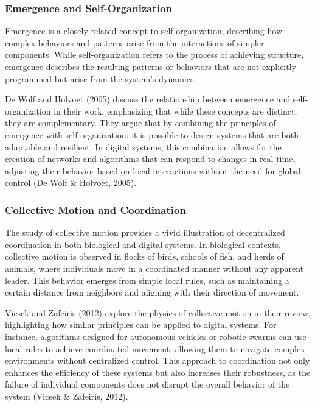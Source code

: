 \documentclass[12pt,twoside]{article}
\begin{document}
\subsubsection{Emergence and Self-Organization}

Emergence is a closely related concept to self-organization, describing how complex behaviors and patterns arise from the interactions of simpler components. While self-organization refers to the process of achieving structure, emergence describes the resulting patterns or behaviors that are not explicitly programmed but arise from the system's dynamics.

De Wolf and Holvoet (2005) discuss the relationship between emergence and self-organization in their work, emphasizing that while these concepts are distinct, they are complementary. They argue that by combining the principles of emergence with self-organization, it is possible to design systems that are both adaptable and resilient. In digital systems, this combination allows for the creation of networks and algorithms that can respond to changes in real-time, adjusting their behavior based on local interactions without the need for global control (De Wolf & Holvoet, 2005).

\subsubsection{Collective Motion and Coordination}

The study of collective motion provides a vivid illustration of decentralized coordination in both biological and digital systems. In biological contexts, collective motion is observed in flocks of birds, schools of fish, and herds of animals, where individuals move in a coordinated manner without any apparent leader. This behavior emerges from simple local rules, such as maintaining a certain distance from neighbors and aligning with their direction of movement.

Vicsek and Zafeiris (2012) explore the physics of collective motion in their review, highlighting how similar principles can be applied to digital systems. For instance, algorithms designed for autonomous vehicles or robotic swarms can use local rules to achieve coordinated movement, allowing them to navigate complex environments without centralized control. This approach to coordination not only enhances the efficiency of these systems but also increases their robustness, as the failure of individual components does not disrupt the overall behavior of the system (Vicsek & Zafeiris, 2012).
\end{document}
